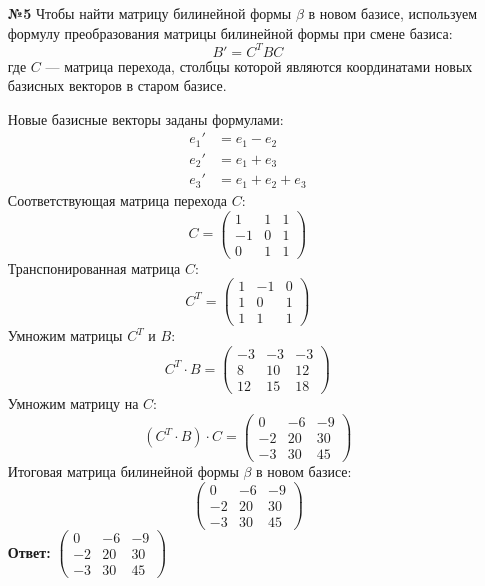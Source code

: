 \documentclass[a4paper]{article}
\begin{document}
\begin{enumerate}
    \item[\textbf{№5}]Чтобы найти матрицу билинейной формы \( \beta \) в новом базисе,
    используем формулу преобразования матрицы билинейной формы при смене базиса:
     \[ B' = C^T B C \] где \( C \) — матрица перехода, 
     столбцы которой являются координатами новых базисных векторов в старом базисе.

    Новые базисные векторы заданы формулами:
    \[
    \begin{aligned}
    e_{1}' &= e_{1} - e_{2} \\
    e_{2}' &= e_{1} + e_{3} \\
    e_{3}' &= e_{1} + e_{2} + e_{3}
    \end{aligned}
    \]
    Соответствующая матрица перехода \( C \):
    \[
    C = \begin{pmatrix}
    1 & 1 & 1 \\
    -1 & 0 & 1 \\
    0 & 1 & 1
    \end{pmatrix}
    \]
    Транспонированная матрица \( C \):
    \[
    C^T = \begin{pmatrix}
    1 & -1 & 0 \\
    1 & 0 & 1 \\
    1 & 1 & 1
    \end{pmatrix}
    \]
    Умножим матрицы \( C^T \) и \( B \):
    \[
    C^T \cdot B = \begin{pmatrix}
    -3 & -3 & -3 \\
    8 & 10 & 12 \\
    12 & 15 & 18
    \end{pmatrix}
    \]
    Умножим матрицу на \( C \):
    \[
    (C^T \cdot B) \cdot C = \begin{pmatrix}
    0 & -6 & -9 \\
    -2 & 20 & 30 \\
    -3 & 30 & 45
    \end{pmatrix}
    \]
    Итоговая матрица билинейной формы \( \beta \) в новом базисе:
    \[
    \begin{pmatrix}
    0 & -6 & -9 \\
    -2 & 20 & 30 \\
    -3 & 30 & 45
    \end{pmatrix}
    \]
    \textbf{Ответ: } $\begin{pmatrix}
        0 & -6 & -9 \\
        -2 & 20 & 30 \\
        -3 & 30 & 45
        \end{pmatrix}$


\end{enumerate}
\end{document}
